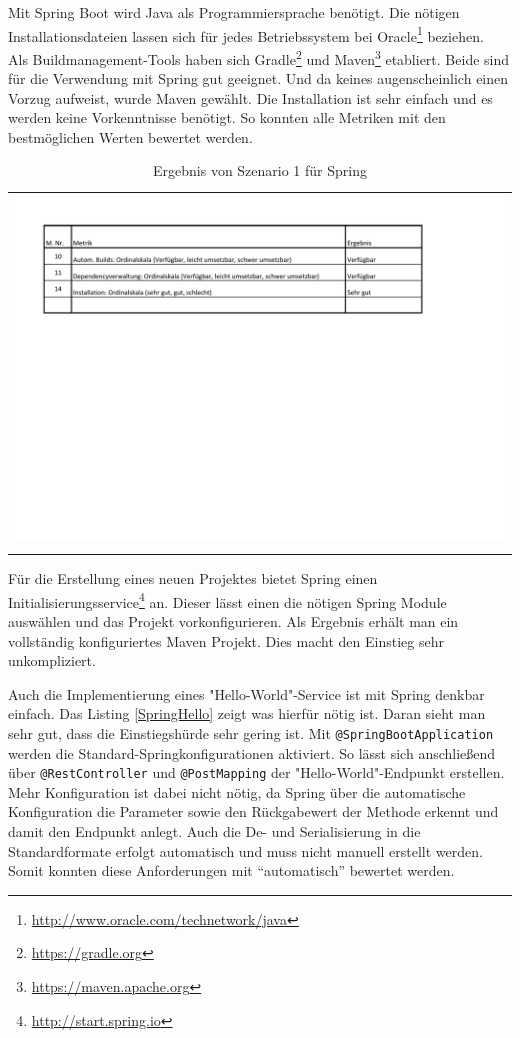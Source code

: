 Mit Spring Boot wird Java als Programmiersprache benötigt. Die nötigen Installationsdateien lassen sich für jedes Betriebssystem bei Oracle\footnote{\url{http://www.oracle.com/technetwork/java}} beziehen.\\
Als Buildmanagement-Tools haben sich Gradle\footnote{\url{https://gradle.org}}  und Maven\footnote{\url{https://maven.apache.org}} etabliert. Beide sind für die Verwendung mit Spring gut geeignet. Und da keines augenscheinlich einen Vorzug aufweist, wurde Maven gewählt. Die Installation ist sehr einfach und es werden keine Vorkenntnisse benötigt. So konnten alle Metriken mit den bestmöglichen Werten bewertet werden.

\begin{longtable}{c}
	\includegraphics[width=\linewidth]{Bilder/Sz1ErgebnisSpring.pdf} \\	
	\caption[Szenario 1 Ergebnis Spring]{Ergebnis von Szenario 1 für Spring}
	\label{Sz1ErgebnisSpring}\\
\end{longtable}
\FloatBarrier

Für die Erstellung eines neuen Projektes bietet Spring einen Initialisierungsservice\footnote{\url{http://start.spring.io}} an. Dieser lässt einen die nötigen Spring Module auswählen und das Projekt vorkonfigurieren. Als Ergebnis erhält man ein vollständig konfiguriertes Maven Projekt.
Dies macht den Einstieg sehr unkompliziert.

Auch die Implementierung eines "Hello-World"-Service ist mit Spring denkbar einfach. Das Listing \ref{SpringHello} zeigt was hierfür nötig ist. Daran sieht man sehr gut, dass die Einstiegshürde sehr gering ist. 
Mit \lstinline|@SpringBootApplication| werden die Standard-Spring\-konfigurationen aktiviert. So lässt sich anschließend über \lstinline|@RestController| und \lstinline|@PostMapping| der "Hello-World"-Endpunkt erstellen.
Mehr Konfiguration ist dabei nicht nötig, da Spring über die automatische Konfiguration die Parameter sowie den Rückgabewert der Methode erkennt und damit den Endpunkt anlegt. Auch die De- und Serialisierung in die Standardformate erfolgt automatisch und muss nicht manuell erstellt werden. Somit konnten diese Anforderungen mit \enquote{automatisch} bewertet werden. 

